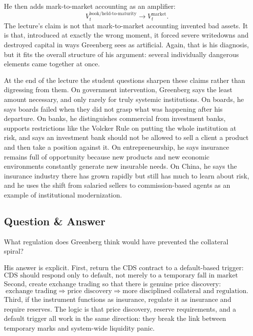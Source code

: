 He then adds mark-to-market accounting as an amplifier:
\begin{equation}
V_t^{\text{book/held-to-maturity}}
\longrightarrow
V_t^{\text{market}}.
\end{equation}
The lecture's claim is not that mark-to-market accounting invented bad assets. It is that, introduced at exactly the wrong moment, it forced severe writedowns and destroyed capital in ways Greenberg sees as artificial. Again, that is his diagnosis, but it fits the overall structure of his argument: several individually dangerous elements came together at once.

At the end of the lecture the student questions sharpen these claims rather than digressing from them. On government intervention, Greenberg says the least amount necessary, and only rarely for truly systemic institutions. On boards, he says boards failed when they did not grasp what was happening after his departure. On banks, he distinguishes commercial from investment banks, supports restrictions like the Volcker Rule on putting the whole institution at risk, and says an investment bank should not be allowed to sell a client a product and then take a position against it. On entrepreneurship, he says insurance remains full of opportunity because new products and new economic environments constantly generate new insurable needs. On China, he says the insurance industry there has grown rapidly but still has much to learn about risk, and he uses the shift from salaried sellers to commission-based agents as an example of institutional modernization.

\subsection{Question \& Answer}

What regulation does Greenberg think would have prevented the collateral spiral?

His answer is explicit. First, return the CDS contract to a default-based trigger:
\begin{equation}
\text{CDS should respond only to default, not merely to a temporary fall in market value.}
\end{equation}
Second, create exchange trading so that there is genuine price discovery:
\begin{equation}
\text{exchange trading}
\Rightarrow
\text{price discovery}
\Rightarrow
\text{more disciplined collateral and regulation.}
\end{equation}
Third, if the instrument functions as insurance, regulate it as insurance and require reserves. The logic is that price discovery, reserve requirements, and a default trigger all work in the same direction: they break the link between temporary marks and system-wide liquidity panic.

